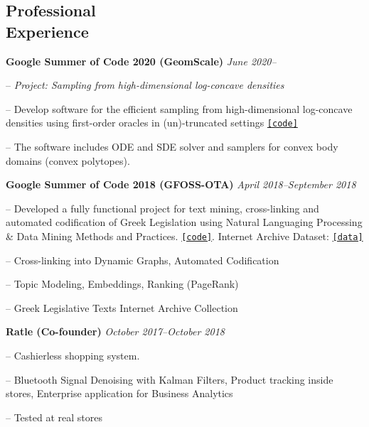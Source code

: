 \documentclass[margin, 10pt]{res}
\newcommand{\field}[2]{\noindent \textbf{#1} \hfill #2 \\}
\newcommand{\specialurl}[2]{\href { #2 } {\nolinkurl{[#1]}}}
\newcommand{\code}[1]{\specialurl {code} {#1}}
\newcommand{\data}[1]{\specialurl {data} {#1}}
\begin{document}
\begin{resume}
 
\section{Professional \\ Experience}
\field{Google Summer of Code 2020 (GeomScale)}  {\emph{June 2020--}}
\begin{compactitem}
\item[--] \emph{Project: Sampling from high-dimensional log-concave densities} 
\item[--] Develop software for the efficient sampling from high-dimensional log-concave densities using first-order oracles in (un)-truncated settings \code{https://GeomScale/volume_approximation}
\item[--] The software includes ODE and SDE solver and samplers for convex body domains (convex polytopes).
\end{compactitem}

\field{Google Summer of Code 2018 (GFOSS-OTA)}  {\emph{April 2018--September 2018}}
\begin{compactitem}
\item[--] Developed a fully functional project for text mining, cross-linking and automated codification of Greek Legislation using Natural Languaging Processing \& Data Mining Methods and Practices.  \code{https://github.com/eellak/gsoc2018-3gm}. Internet Archive Dataset: \data{https://archive.org/details/greekgovernmentgazette} 

\begin{compactitem}
\item[--] Cross-linking into Dynamic Graphs, Automated Codification
\item[--] Topic Modeling, Embeddings, Ranking (PageRank)
\item[--] Greek Legislative Texts Internet Archive Collection 
\end{compactitem}
\end{compactitem}

\field{Ratle (Co-founder)} {\emph{October 2017--October 2018}}
\begin{compactitem}
\item[--] Cashierless shopping system.
\item[--] Bluetooth Signal Denoising with Kalman Filters, Product tracking inside stores, Enterprise application for Business Analytics
\item[--] Tested at real stores %
\end{compactitem}



\end{resume}
\end{document}
